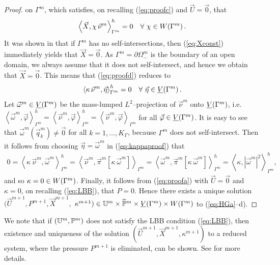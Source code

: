 \begin{proof}
on $\Gamma^m$, which satisfies, on recalling (\ref{eq:proofc}) and $\vec U =
\vec 0$, that
\begin{equation} \label{eq:Xconst}
\left\langle \vec X, \chi\,\vec\nu^m \right\rangle_{\Gamma^m}^h = 0
\quad\forall\ \chi \in W(\Gamma^m)\,.
\end{equation}
It was shown in \cite[Proof of Theorem~2.1]{gflows3d} that if $\Gamma^m$
has no self-intersections, then (\ref{eq:Xconst}) immediately yields that $\vec
X = \vec 0$. As $\Gamma^m = \partial\Omega^m_-$ is the boundary of an open
domain, we always assume that it does not self-intersect, and
hence we obtain that $\vec X = \vec 0$. This means that (\ref{eq:proofd})
reduces to
\begin{equation} \label{eq:kappaproof}
\left\langle \kappa\,\vec\nu^m, \vec\eta \right\rangle_{\Gamma^m}^h = 0
\quad\forall\ \vec\eta \in \underline{V}(\Gamma^m)\,.
\end{equation}
Let $\vec\omega^m \in \underline{V}(\Gamma^m)$ be the mass-lumped $L^2$--projection of $\vec\nu^m$
onto $\underline{V}(\Gamma^m)$, i.e. $\left\langle \vec\omega^m, \vec\varphi
\right\rangle_{\Gamma^m}^h = \left\langle \vec\nu^m,
\vec\varphi \right\rangle_{\Gamma^m}^h = \left\langle \vec\nu^m,
\vec\varphi \right\rangle_{\Gamma^m}$ for all $\vec\varphi\in\underline{V}(\Gamma^m)$. It is easy
to see that $\vec\omega^m (\vec q^m_k) \not= \vec 0$ for
all $k=1,\ldots,K_\Gamma$, because $\Gamma^m$ does not self-intersect.
Then it follows from choosing $\vec\eta = \vec\omega^m$ in (\ref{eq:kappaproof})
that
\begin{align*}
0 = \left\langle \kappa\,\vec\nu^m, \vec\omega^m \right\rangle_{\Gamma^m}^h
= \left\langle \vec\nu^m, \vec\pi^m[\kappa\,\vec\omega^m]
\right\rangle_{\Gamma^m}
= \left\langle \vec\omega^m,
\vec\pi^m[\kappa\,\vec\omega^m] \right\rangle_{\Gamma^m}^h
= \left\langle \kappa, |\vec\omega^m|^2 \right\rangle_{\Gamma^m}^h ,
\end{align*}
and so $\kappa = 0 \in W(\Gamma^m)$. Finally, it follows from (\ref{eq:proofa}) with
$\vec U = \vec 0$ and $\kappa = 0$, on recalling (\ref{eq:LBB}), that $P = 0$.
Hence there exists a unique solution $(\vec U^{m+1}, P^{m+1}, \vec{X}^{m+1},$
$\kappa^{m+1}) \in \mathbb{U}^m\times \widetilde{\mathbb{P}}^m \times \underline{V}(\Gamma^m) \times W(\Gamma^m)$ to
(\ref{eq:HGa}--d).
\end{proof}

We note that if $(\mathbb{U}^m,\mathbb{P}^m)$ does not satisfy the LBB condition
(\ref{eq:LBB}), then existence and uniqueness of the solution
$(\vec U^{m+1},\vec X^{m+1},\kappa^{m+1})$ to a reduced system, where the
pressure $P^{m+1}$ is eliminated, can be shown. See \cite[Theorem~1]{spurious}
for more details.

